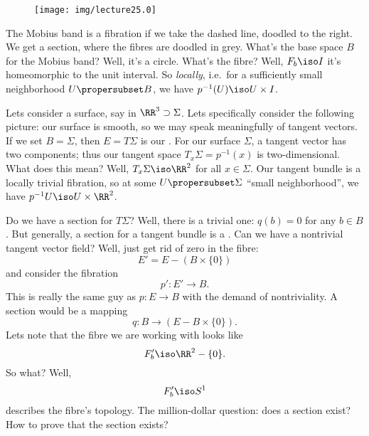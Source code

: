 \begin{wrapfigure}{r}{6pc}
  \centering
  \texttt{[image: img/lecture25.0]}
  \vspace{-12pt}
\end{wrapfigure}

The Mobius band is a fibration if
we take the dashed line, doodled to the right. We get a section,
where the fibres are doodled in grey. What's the base space $B$
for the Mobius band? Well, it's a circle. What's the fibre? Well,
$F_{b}\iso I$ it's homeomorphic to the unit interval. So
\emph{locally}, i.e.\ for a sufficiently small neighborhood
$U\propersubset B$, we have $p^{-1}(U)\iso U\times I$.

Lets consider a surface, say in $\RR^3\supset\Sigma$. Lets specifically
consider the following picture: our surface is smooth, so we may
speak meaningfully of tangent vectors. If we set $B=\Sigma$, then
$E=T\Sigma$ is our . 
For our surface $\Sigma$, a tangent vector has two components;
thus our tangent space $T_{x}\Sigma=p^{-1}(x)$ is
two-dimensional. What does this mean? Well,
$T_{x}\Sigma\iso\RR^2$ for all $x\in\Sigma$. Our tangent bundle
is a locally trivial fibration, so at some $U\propersubset\Sigma$
``small neighborhood'', we have $p^{-1}U\iso U\times\RR^2$.

Do we have a section for $T\Sigma$? Well, there is a trivial one:
$q(b)=0$ for any $b\in B$. But generally, a section for a tangent
bundle is a .%
Can we have a nontrivial tangent vector field? Well, just get rid
of zero in the fibre:
\begin{equation*}
E'=E-(B\times\{0\})
\end{equation*}
and consider the fibration
\begin{equation}
p'\colon E'\to B.
\end{equation}
This is really the same guy as $p\colon E\to B$ with the demand
of nontriviality. A section would be a mapping
\begin{equation}
q\colon B\to(E-B\times\{0\}).
\end{equation}
Lets note that the fibre we are working with looks like
\begin{equation}
F'_{b}\iso\RR^{2}-\{0\}.
\end{equation}
So what? Well,
\begin{equation}
F'_{b}\iso S^{1}
\end{equation}
describes the fibre's topology. The million-dollar question: does
a section exist? How to prove that the section exists?

